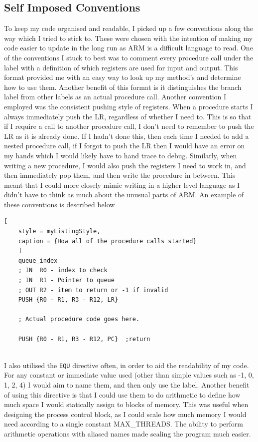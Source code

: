 \subsection{Self Imposed Conventions}
To keep my code organised and readable, I picked up a few conventions along the way which I tried to stick to. These were chosen with the intention of making my code easier to update in the long run as ARM is a difficult language to read. One of the conventions I stuck to best was to comment every procedure call under the label with a definition of which registers are used for input and output. This format provided me with an easy way to look up my method's and determine how to use them. Another benefit of this format is it distinguishes the branch label from other labels as an actual procedure call. Another convention I employed was the consistent pushing style of registers. When a procedure starts I always immediately push the LR, regardless of whether I need to. This is so that if I require a call to another procedure call, I don't need to remember to push the LR as it is already done. If I hadn't done this, then each time I needed to add a nested procedure call, if I forgot to push the LR then I would have an error on my hands which I would likely have to hand trace to debug. Similarly, when writing a new procedure, I would also push the registers I need to work in, and then immediately pop them, and then write the procedure in between. This meant that I could more closely mimic writing in a higher level language as I didn't have to think as much about the unusual parts of ARM. An example of these conventions is described below
\begin{lstlisting}[
	style = myListingStyle,
	caption = {How all of the procedure calls started}
	]
	queue_index
	; IN  R0 - index to check
	; IN  R1 - Pointer to queue
	; OUT R2 - item to return or -1 if invalid
	PUSH {R0 - R1, R3 - R12, LR}
	
	; Actual procedure code goes here.	
	
	PUSH {R0 - R1, R3 - R12, PC}  ;return
	
\end{lstlisting}
I also utilised the \verb|EQU| directive often, in order to aid the readability of my code. For any constant or immediate value used (other than simple values such as -1, 0, 1, 2, 4) I would aim to name them, and then only use the label. Another benefit of using this directive is that I could use them to do arithmetic to define how much space I would statically assign to blocks of memory. This was useful when designing the process control block, as I could scale how much memory I would need according to a single constant MAX\_THREADS. The ability to perform arithmetic operations with aliased names made scaling the program much easier. 
